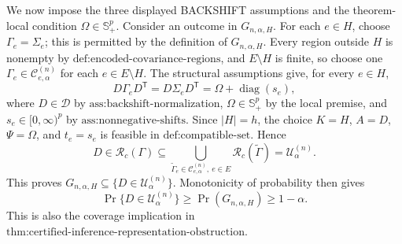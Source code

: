 We now impose the three displayed BACKSHIFT assumptions and the theorem-local condition \(\Omega\in\mathbb S_+^p\). Consider an outcome in \(G_{n,\alpha,H}\). For each \(e\in H\), choose \(\Gamma_e=\Sigma_e\); this is permitted by the definition of \(G_{n,\alpha,H}\). Every region outside \(H\) is nonempty by \(\text{def:encoded-covariance-regions}\), and \(E\setminus H\) is finite, so choose one \(\Gamma_e\in\mathcal C^{(n)}_{e,\alpha}\) for each \(e\in E\setminus H\). The structural assumptions give, for every \(e\in H\),
\[
D\Gamma_eD^{\mathsf T}
=D\Sigma_eD^{\mathsf T}
=\Omega+\operatorname{diag}(s_e),
\]
where \(D\in\mathcal D\) by \(\text{ass:backshift-normalization}\), \(\Omega\in\mathbb S_+^p\) by the local premise, and \(s_e\in[0,\infty)^p\) by \(\text{ass:nonnegative-shifts}\). Since \(|H|=h\), the choice \(K=H\), \(A=D\), \(\Psi=\Omega\), and \(t_e=s_e\) is feasible in \(\text{def:compatible-set}\). Hence
\[
D\in\mathcal R_c(\Gamma)
\subseteq
\bigcup_{\widetilde\Gamma_e\in\mathcal C^{(n)}_{e,\alpha},\ e\in E}
\mathcal R_c(\widetilde\Gamma)
=\mathcal U^{(n)}_\alpha.
\]
This proves \(G_{n,\alpha,H}\subseteq\{D\in\mathcal U^{(n)}_\alpha\}\). Monotonicity of probability then gives
\[
\Pr\{D\in\mathcal U^{(n)}_\alpha\}
\geq\Pr(G_{n,\alpha,H})\geq1-\alpha.
\]
This is also the coverage implication in \(\text{thm:certified-inference-representation-obstruction}\).


